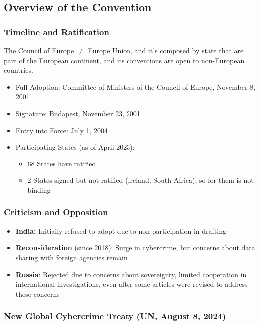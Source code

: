 \subsection{Overview of the Convention}

\subsubsection{Timeline and Ratification}

\begin{boxH}
  The Council of Europe $\neq$ Europe Union, and it's composed by state that are part of the European continent, and its conventions are open to non-European countries.
\end{boxH}

\begin{itemize}[itemsep=0pt]
  \item Full Adoption: Committee of Ministers of the Council of Europe, November 8, 2001
  \item Signature: Budapest, November 23, 2001
  \item Entry into Force: July 1, 2004
  \item Participating States (as of April 2023):
    \begin{itemize}[itemsep=0pt]
      \item 68 States have ratified
      \item 2 States signed but not ratified (Ireland, South Africa), so for them is not binding
    \end{itemize}
\end{itemize}

\subsubsection{Criticism and Opposition}
\begin{itemize}[itemsep=0pt]
  \item \textbf{India:} Initially refused to adopt due to non-participation in drafting
  \item \textbf{Reconsideration} (since 2018): Surge in cybercrime, but concerns about data sharing with foreign agencies remain
  \item \textbf{Russia}: Rejected due to concerns about sovereignty, limited cooperation in international investigations, even after some articles were revised to address these concerns
\end{itemize}

\subsubsection{New Global Cybercrime Treaty (UN, August 8, 2024)}

